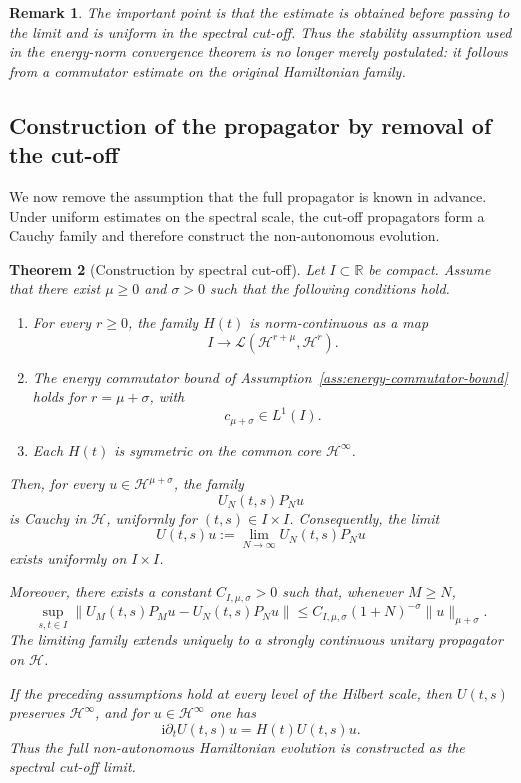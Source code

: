 \documentclass[10pt,a4paper]{amsart}
\newtheorem{theorem}{Theorem}[section]
\newtheorem{remark}[theorem]{Remark}
\newcommand{\Hilb}{\mathcal H}
\newcommand{\ii}{\mathrm i}
\begin{document}
\begin{remark}
The important point is that the estimate is obtained before passing to the
limit and is uniform in the spectral cut-off. Thus the stability assumption
used in the energy-norm convergence theorem is no longer merely postulated:
it follows from a commutator estimate on the original Hamiltonian family.
\end{remark}


\subsection{Construction of the propagator by removal of the cut-off}
\label{subsec:constructive-propagator}

We now remove the assumption that the full propagator is known in advance.
Under uniform estimates on the spectral scale, the cut-off propagators form a
Cauchy family and therefore construct the non-autonomous evolution.


\begin{theorem}[Construction by spectral cut-off]
\label{thm:construction-by-spectral-cutoff}
Let \(I\subset\mathbb{R}\) be compact. Assume that there exist
\(\mu\geq 0\) and \(\sigma>0\) such that the following conditions hold.

\begin{enumerate}
\item For every \(r\geq 0\), the family \(H(t)\) is norm-continuous as a map
\[
I\longrightarrow
\mathcal{L}(\Hilb^{r+\mu},\Hilb^{r}).
\]

\item The energy commutator bound of
Assumption~\ref{ass:energy-commutator-bound} holds for
\(r=\mu+\sigma\), with
\[
c_{\mu+\sigma}\in L^{1}(I).
\]

\item Each \(H(t)\) is symmetric on the common core
\(\Hilb^{\infty}\).
\end{enumerate}

Then, for every \(u\in\Hilb^{\mu+\sigma}\), the family
\[
U_{N}(t,s)P_{N}u
\]
is Cauchy in \(\Hilb\), uniformly for \((t,s)\in I\times I\).
Consequently, the limit
\[
U(t,s)u
:=
\lim_{N\to\infty}U_{N}(t,s)P_{N}u
\]
exists uniformly on \(I\times I\).

Moreover, there exists a constant \(C_{I,\mu,\sigma}>0\) such that, whenever
\(M\geq N\),
\[
\sup_{s,t\in I}
\|U_{M}(t,s)P_{M}u-U_{N}(t,s)P_{N}u\|
\leq
C_{I,\mu,\sigma}(1+N)^{-\sigma}
\|u\|_{\mu+\sigma}.
\]
The limiting family extends uniquely to a strongly continuous unitary
propagator on \(\Hilb\).

If the preceding assumptions hold at every level of the Hilbert scale, then
\(U(t,s)\) preserves \(\Hilb^{\infty}\), and for
\(u\in\Hilb^{\infty}\) one has
\[
\ii\partial_{t}U(t,s)u
=
H(t)U(t,s)u.
\]
Thus the full non-autonomous Hamiltonian evolution is constructed as the
spectral cut-off limit.
\end{theorem}
\end{document}
